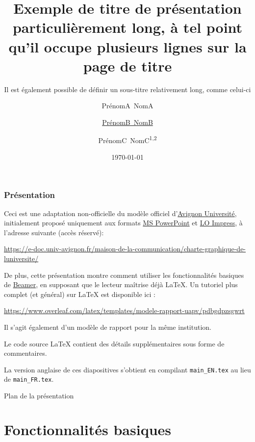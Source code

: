 \documentclass[10pt,    %
    french,             %
    xcolor=table,       %
    envcountsect,       %
    aspectratio=43      %
]{beamer}
\title[Titre court] %
    {Exemple de titre de présentation particulièrement long, à tel point qu'il occupe plusieurs lignes sur la page de titre}
\subtitle{Il est également possible de définir un sous-titre relativement long, comme celui-ci} %
\date[Date courte]  %
    {\today}        %
\author[Auteur court] %
{PrénomA~NomA\inst{1} \and \underline{PrénomB~NomB}\inst{2} \and PrénomC~NomC\textsuperscript{1,2}}
\institute[] %
{\inst{1} Laboratoire Informatique d'Avignon -- LIA EA 4128 \texttt{\{prénom.nom\}@univ-avignon.fr}
\and \inst{2} Institut d'Innovation Disruptive, Université de l'Excellence \texttt{\{prénom.nom\}@univ-excell.fr}
}
\begin{document}
\begin{frame}
  \titlepage
\end{frame}

\begin{frame}
    \label{frm:first}
    \frametitle{Présentation} 
    
    Ceci est une adaptation non-officielle du modèle officiel d'\href{http://univ-avignon.fr/}{Avignon Université}, initialement proposé uniquement aux formats \href{https://en.wikipedia.org/wiki/Microsoft\_PowerPoint}{MS PowerPoint} et \href{https://en.wikipedia.org/wiki/LibreOffice\#Included\_applications}{LO Impress}, à l'adresse  suivante (accès réservé):
    
    \url{https://e-doc.univ-avignon.fr/maison-de-la-communication/charte-graphique-de-luniversite/}
    
    \smallskip
    De plus, cette présentation montre comment utiliser les fonctionnalités basiques de \href{https://en.wikipedia.org/wiki/Beamer_(LaTeX)}{Beamer}, en supposant que le lecteur maîtrise déjà \LaTeX{}. Un tutoriel plus complet (et général) sur \LaTeX{} est disponible ici : 
    
    \url{https://www.overleaf.com/latex/templates/modele-rapport-uapv/pdbgdpzsgwrt}
    
    Il s'agit également d'un modèle de rapport pour la même institution.
    
    \smallskip
    Le code source \LaTeX{} contient des détails supplémentaires sous forme de commentaires.
    
    \smallskip
    La version anglaise de ces diapositives s'obtient en compilant \texttt{main\_EN.tex} au lieu de \texttt{main\_FR.tex}.
\end{frame}

\begin{frame}{Plan de la présentation}
    \tableofcontents
\end{frame}












\section{Fonctionnalités basiques}
\label{sec:basics}
\sectionframe
\end{document}
